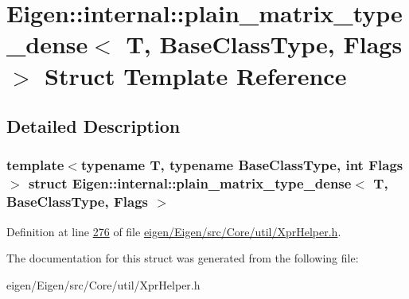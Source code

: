\hypertarget{struct_eigen_1_1internal_1_1plain__matrix__type__dense}{}\section{Eigen\+:\+:internal\+:\+:plain\+\_\+matrix\+\_\+type\+\_\+dense$<$ T, Base\+Class\+Type, Flags $>$ Struct Template Reference}
\label{struct_eigen_1_1internal_1_1plain__matrix__type__dense}


\subsection{Detailed Description}
\subsubsection*{template$<$typename T, typename Base\+Class\+Type, int Flags$>$\newline
struct Eigen\+::internal\+::plain\+\_\+matrix\+\_\+type\+\_\+dense$<$ T, Base\+Class\+Type, Flags $>$}



Definition at line \hyperlink{eigen_2_eigen_2src_2_core_2util_2_xpr_helper_8h_source_l00276}{276} of file \hyperlink{eigen_2_eigen_2src_2_core_2util_2_xpr_helper_8h_source}{eigen/\+Eigen/src/\+Core/util/\+Xpr\+Helper.\+h}.



The documentation for this struct was generated from the following file\+:\begin{DoxyCompactItemize}
\item 
eigen/\+Eigen/src/\+Core/util/\+Xpr\+Helper.\+h\end{DoxyCompactItemize}
